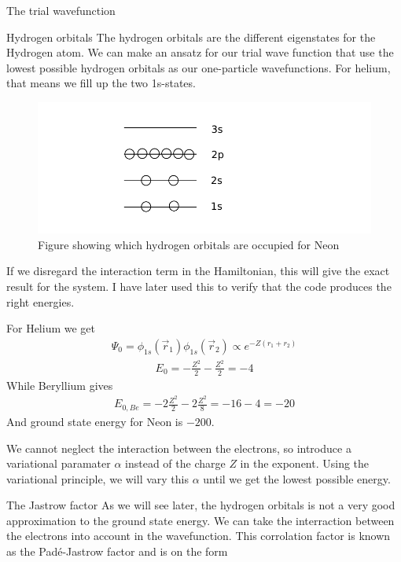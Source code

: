 \documentclass[a4paper, 12pt, titlepage]{article}
\begin{document}
\begin{section}{The trial wavefunction}
 \begin{subsection}{Hydrogen orbitals}
  The hydrogen orbitals are the different eigenstates for the Hydrogen atom. We can make an ansatz for our trial wave function that use the lowest possible hydrogen orbitals as our one-particle wavefunctions. For helium, that means we fill up the two 1s-states. 
 \begin{figure}[H]
  	\centering
  	\includegraphics{orbitals.pdf}
  	\caption{Figure showing which hydrogen orbitals are occupied for Neon}
  \end{figure}
  If we disregard the interaction term in the Hamiltonian, this will give the exact result for the system. I have later used this to verify that the code produces the right energies. \par
  For Helium we get
  \begin{align}
  	\Psi_0 = \phi_{1s}(\vec r_1) \phi_{1s}(\vec r_2) \propto e^{-Z(r_1+r_2)} 
  \end{align}
  \begin{align}
  	E_0 = -\frac{Z^2}{2} - \frac{Z^2}{2} = -4
  \end{align}
  While Beryllium gives
  \begin{align}
  	E_{0, Be} = -2\frac{Z^2}{2} - 2 \frac{Z^2}{8} = -16 - 4 = -20
  \end{align}
  And ground state energy for Neon is $-200$. \par
  We cannot neglect the interaction between the electrons, so introduce a variational paramater $\alpha$ instead of the charge $Z$ in the exponent. Using the variational principle, we will vary this $\alpha$ until we get the lowest possible energy. 
 \end{subsection}
 \begin{subsection}{The Jastrow factor}
  As we will see later, the hydrogen orbitals is not a very good approximation to the ground state energy. We can take the interraction between the electrons into account in the wavefunction. This corrolation factor is known as the Padé-Jastrow factor and is on the form

\end{subsection}
\end{section}
\end{document}
